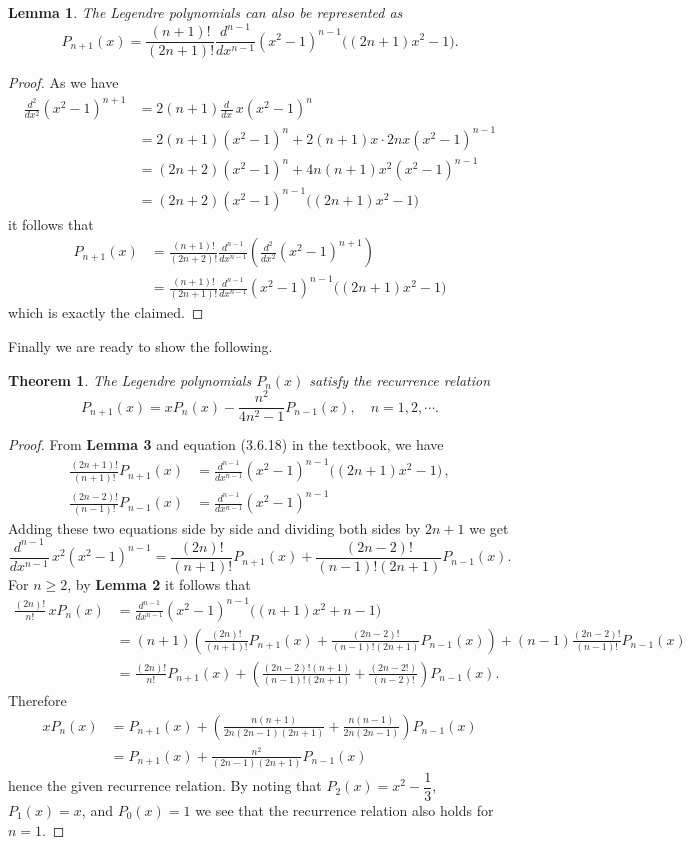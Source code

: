 \documentclass{article}
\newtheorem{lemma}{Lemma}
\newtheorem{thm}{Theorem}
\newcommand{\ddx}[1]{\frac{d^{#1}}{dx^{#1}}}
\begin{document}
  \begin{lemma}
    The Legendre polynomials can also be represented as \[
    P_{n+1}(x) = \frac{(n+1)!}{(2n+1)!}\ddx{n-1} (x^2-1)^{n-1}\big((2n+1)x^2-1\big) .
    \]
  \end{lemma} \begin{proof}
    As we have \begin{align*}
      \ddx{2}(x^2-1)^{n+1} &= 2(n+1)\ddx{}\, x(x^2-1)^n \\
                           &= 2(n+1)(x^2-1)^n +2(n+1)x\cdot 2nx(x^2-1)^{n-1}\\
                           &= (2n+2)(x^2-1)^n + 4n(n+1)x^2(x^2-1)^{n-1} \\
                           &= (2n+2)(x^2-1)^{n-1}\big((2n+1)x^2-1\big)
    \end{align*} it follows that \begin{align*}
    P_{n+1}(x) &= \frac{(n+1)!}{(2n+2)!} \ddx{n-1}\left( \ddx{2} (x^2-1)^{n+1}  \right) \\
    &= \frac{(n+1)!}{(2n+1)!} \ddx{n-1}(x^2-1)^{n-1}\big((2n+1)x^2-1\big)
    \end{align*} which is exactly the claimed.
  \end{proof}
  Finally we are ready to show the following. 
  \begin{thm}
    The Legendre polynomials $P_n(x)$ satisfy the recurrence relation \[
  P_{n+1}(x) = xP_n(x) - \frac{n^2}{4n^2-1}P_{n-1}(x), \quad n=1, 2, \cdots. 
  \]
  \end{thm} \begin{proof}
    From \textbf{Lemma 3} and equation (3.6.18) in the textbook, we have \begin{align*}
      \frac{(2n+1)!}{(n+1)!} P_{n+1}(x) &= \ddx{n-1}(x^2-1)^{n-1}\big((2n+1)x^2 - 1\big)\, , \\
      \frac{(2n-2)!}{(n-1)!} P_{n-1}(x) &= \ddx{n-1}(x^2-1)^{n-1}
    \end{align*} Adding these two equations side by side and dividing both sides by $2n+1$ we get \[
      \ddx{n-1}\, x^2(x^2-1)^{n-1} = \frac{(2n)!}{(n+1)!}P_{n+1}(x) + \frac{(2n-2)!}{(n-1)!(2n+1)} P_{n-1}(x).
    \] For $n\geq 2$, by \textbf{Lemma 2} it follows that \begin{align*}
  \frac{(2n)!}{n!}\, xP_n(x)&= \ddx{n-1}(x^2-1)^{n-1}\big((n+1)x^2+n-1\big)\\
   &= (n+1)\left( \frac{(2n)!}{(n+1)!}P_{n+1}(x) + \frac{(2n-2)!}{(n-1)!(2n+1)} P_{n-1}(x) \right) + (n-1)\frac{(2n-2)!}{(n-1)!}P_{n-1}(x) \\
   &= \frac{(2n)!}{n!}P_{n+1}(x) + \left( \frac{(2n-2)!(n+1)}{(n-1)!(2n+1)} +{ \frac{(2n-2!)}{(n-2)!}} \right) P_{n-1}(x).
    \end{align*} Therefore \begin{align*}
      xP_n(x)&= P_{n+1}(x) + \left( \frac{n(n+1)}{2n(2n-1)(2n+1)}+\frac{n(n-1)}{2n(2n-1)}\right) P_{n-1}(x) \\
      &= P_{n+1}(x) + \frac{n^2}{(2n-1)(2n+1)} P_{n-1}(x)
    \end{align*} hence the given recurrence relation. By noting that $P_2(x) = x^2-\dfrac{1}{3}$, $P_1(x) =x$, and $P_0(x)= 1$ we see that the recurrence relation also holds for $n=1$.  
  \end{proof}
\end{document}
